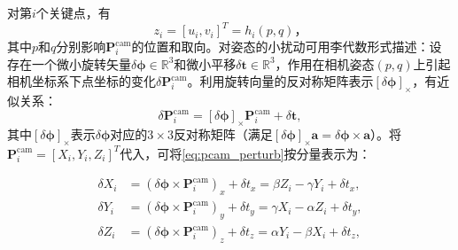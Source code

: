 对第$i$个关键点，有
\begin{equation}
	z_{i} = [u_i, v_i]^T = h_i(p,q)，
\end{equation}
其中$p$和$q$分别影响$\mathbf{P}_i^{\mathrm{cam}}$的位置和取向。对姿态的小扰动可用李代数形式描述：设存在一个微小旋转矢量$\delta \boldsymbol{\phi}\in \mathbb{R}^3$和微小平移$\delta \mathbf{t}\in\mathbb{R}^3$，作用在相机姿态$(p,q)$上引起相机坐标系下点坐标的变化$\delta \mathbf{P}_i^{\mathrm{cam}}$。利用旋转向量的反对称矩阵表示$[\delta \boldsymbol{\phi}]_\times$，有近似关系： \begin{equation}\label{eq:pcam_perturb} \delta \mathbf{P}_i^{\mathrm{cam}} = [\delta \boldsymbol{\phi}]_{\times}\mathbf{P}_i^{\mathrm{cam}} + \delta \mathbf{t}, \end{equation} 其中$[\delta \boldsymbol{\phi}]_{\times}$表示$\delta \boldsymbol{\phi}$对应的$3\times 3$反对称矩阵（满足$[\delta \boldsymbol{\phi}]_{\times} \mathbf{a} = \delta \boldsymbol{\phi} \times \mathbf{a}$）。将$\mathbf{P}_i^{\mathrm{cam}}=[X_i, Y_i, Z_i]^T$代入，可将\eqref{eq:pcam_perturb}按分量表示为：

\begin{align}
	\delta X_i &= (\delta \boldsymbol{\phi}\times \mathbf{P}_i^{\mathrm{cam}})_x + \delta t_x = \beta Z_i - \gamma Y_i + \delta t_x,\\ 
	\delta Y_i &= (\delta \boldsymbol{\phi}\times \mathbf{P}_i^{\mathrm{cam}})_y + \delta t_y = \gamma X_i - \alpha Z_i + \delta t_y,\\ 
	\delta Z_i &= (\delta \boldsymbol{\phi}\times \mathbf{P}_i^{\mathrm{cam}})_z + \delta t_z = \alpha Y_i - \beta X_i + \delta t_z,
\end{align}

